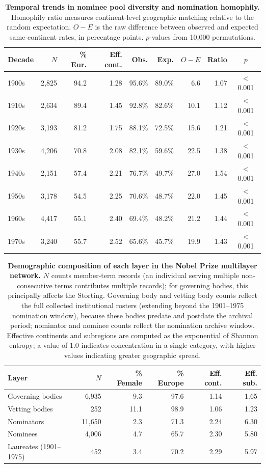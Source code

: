 \documentclass[12pt]{article}
\begin{document}
\begin{table}
\centering
\caption{\textbf{Temporal trends in nominee pool diversity and nomination homophily.} Homophily ratio measures continent-level geographic matching relative to the random expectation. $O - E$ is the raw difference between observed and expected same-continent rates, in percentage points. $p$-values from 10,000 permutations.}
\label{tab:temporal_homophily}
\small
\begin{tabular}{lrrrrrrrc}
\hline
Decade & $N$ & \% Eur. & Eff. cont. & Obs. & Exp. & $O - E$ & Ratio & $p$ \\
\hline
1900s & 2,825 & 94.2 & 1.28 & 95.6\% & 89.0\% & 6.6 & 1.07 & $<$0.001 \\
1910s & 2,634 & 89.4 & 1.45 & 92.8\% & 82.6\% & 10.1 & 1.12 & $<$0.001 \\
1920s & 3,193 & 81.2 & 1.75 & 88.1\% & 72.5\% & 15.6 & 1.21 & $<$0.001 \\
1930s & 4,206 & 70.8 & 2.08 & 82.1\% & 59.6\% & 22.5 & 1.38 & $<$0.001 \\
1940s & 2,151 & 57.4 & 2.21 & 76.7\% & 49.7\% & 27.0 & 1.54 & $<$0.001 \\
1950s & 3,178 & 54.5 & 2.25 & 70.6\% & 48.7\% & 22.0 & 1.45 & $<$0.001 \\
1960s & 4,417 & 55.1 & 2.40 & 69.4\% & 48.2\% & 21.2 & 1.44 & $<$0.001 \\
1970s & 3,240 & 55.7 & 2.52 & 65.6\% & 45.7\% & 19.9 & 1.43 & $<$0.001 \\
\hline
\end{tabular}
\end{table}

\begin{table}
\centering
\caption{\textbf{Demographic composition of each layer in the Nobel Prize multilayer network.} $N$ counts member-term records (an individual serving multiple non-consecutive terms contributes multiple records); for governing bodies, this principally affects the Storting. Governing body and vetting body counts reflect the full collected institutional rosters (extending beyond the 1901--1975 nomination window), because these bodies predate and postdate the archival period; nominator and nominee counts reflect the nomination archive window. Effective continents and subregions are computed as the exponential of Shannon entropy; a value of 1.0 indicates concentration in a single category, with higher values indicating greater geographic spread.}
\label{tab:layer_composition}
\small
\begin{tabular}{lrrrrr}
\hline
Layer & $N$ & \% Female & \% Europe & Eff. cont. & Eff. sub. \\
\hline
Governing bodies & 6,935 & 9.3 & 97.6 & 1.14 & 1.65 \\
Vetting bodies & 252 & 11.1 & 98.9 & 1.06 & 1.23 \\
Nominators & 11,650 & 2.3 & 71.3 & 2.24 & 6.30 \\
Nominees & 4,006 & 4.7 & 65.7 & 2.30 & 5.80 \\
Laureates (1901--1975) & 452 & 3.4 & 70.2 & 2.29 & 5.97 \\
\hline
\end{tabular}
\end{table}


\end{document}
